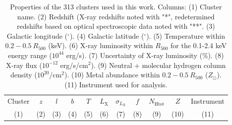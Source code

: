 \documentclass{aa}   %
\begin{document}
\begin{table}[ht!]
\caption{\small{Properties of the 313 clusters used in this work. Columns: (1) Cluster name. (2) Redshift (X-ray redshifts noted with "*", redetermined redshifts based on optical spectroscopic data noted with "**"}. (3) Galactic longitude ($^{\circ}$). (4) Galactic latitude ($^{\circ}$). (5) Temperature within $0.2-0.5\ R_{500}$ (keV).  (6) X-ray luminosity within $R_{500}$ for the 0.1-2.4 keV energy range ($10^{44}$ erg/s). (7) Uncertainty of X-ray luminosity (\%). (8) X-ray flux ($10^{-12}$ erg/s/cm$^2$). (9) Neutral + molecular hydrogen column density ($10^{20}$/cm$^2$). (10) Metal abundance within $0.2-0.5\ R_{500}$ ($Z_{\odot}$). (11) Instrument used for analysis.  }
\label{tab2}
\begin{center}
\renewcommand{\arraystretch}{1.3}
\small
\begin{tabular}{ c  c  c  c c c c c c c c }
\hline \hline


Cluster  & $z$ & $l$ & $b$ & $T$  &  $L_{\text{X}}$ & $\sigma _{L_{\text{X}}}$  & $f$ & $N_{\text{Htot}}$ & $Z$ & Instrument  \\
(1) & (2) & (3) & (4) & (5) & (6) & (7) & (8) & (9) & (10) & (11) \\
\hline \hline


\end{tabular}
\end{center}
\end{table}
\end{document}
